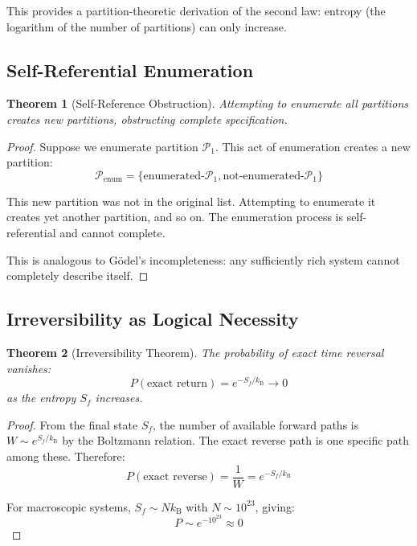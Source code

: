 \documentclass[twocolumn,10pt,a4paper]{article}
\newtheorem{theorem}{Theorem}[section]
\theoremstyle{definition}
\theoremstyle{remark}
\newcommand{\kB}{k_{\mathrm{B}}}
\begin{document}
This provides a partition-theoretic derivation of the second law: entropy (the logarithm of the number of partitions) can only increase.

\subsection{Self-Referential Enumeration}

\begin{theorem}[Self-Reference Obstruction]
\label{thm:self_reference}
Attempting to enumerate all partitions creates new partitions, obstructing complete specification.
\end{theorem}

\begin{proof}
Suppose we enumerate partition $\mathcal{P}_1$. This act of enumeration creates a new partition:
\begin{equation}
    \mathcal{P}_{\text{enum}} = \{\text{enumerated-}\mathcal{P}_1, \text{not-enumerated-}\mathcal{P}_1\}
\end{equation}

This new partition was not in the original list. Attempting to enumerate it creates yet another partition, and so on. The enumeration process is self-referential and cannot complete.

This is analogous to G\"{o}del's incompleteness: any sufficiently rich system cannot completely describe itself.
\end{proof}

\subsection{Irreversibility as Logical Necessity}

\begin{theorem}[Irreversibility Theorem]
\label{thm:irreversibility}
The probability of exact time reversal vanishes:
\begin{equation}
    P(\text{exact return}) = e^{-S_f/\kB} \to 0
\end{equation}
as the entropy $S_f$ increases.
\end{theorem}

\begin{proof}
From the final state $S_f$, the number of available forward paths is $W \sim e^{S_f/\kB}$ by the Boltzmann relation. The exact reverse path is one specific path among these. Therefore:
\begin{equation}
    P(\text{exact reverse}) = \frac{1}{W} = e^{-S_f/\kB}
\end{equation}

For macroscopic systems, $S_f \sim N\kB$ with $N \sim 10^{23}$, giving:
\begin{equation}
    P \sim e^{-10^{23}} \approx 0
\end{equation}
\end{proof}
\end{document}
